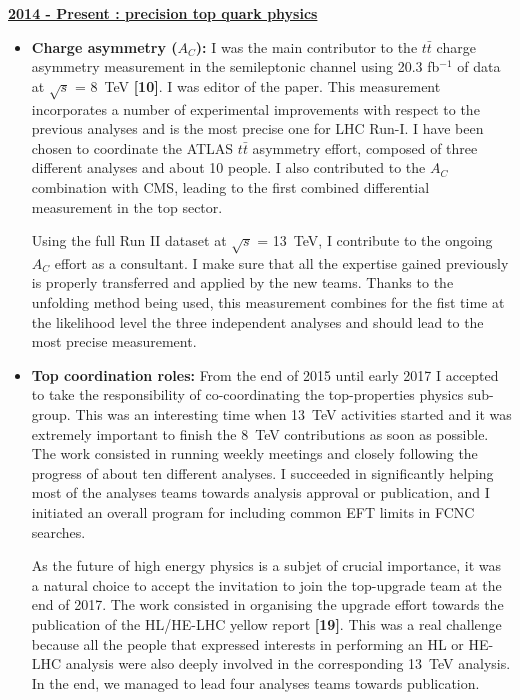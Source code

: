\documentclass[12pt]{article}
\begin{document}
{\bf \underline{2014 - Present : precision top quark physics}}
\vskip 0.3cm
\begin{itemize}[leftmargin=1.3cm]
\itemsep0.8em

\item[] {\bf Charge asymmetry ($A_C$):}
I was the main contributor to the $t\bar{t}$ charge asymmetry measurement in the semileptonic channel 
using 20.3 fb$^{-1}$ of data at $\sqrt{s}$ = 8~TeV {\bf \color{red} [10]}. I was editor of the paper. This measurement incorporates a number of experimental improvements with respect to the previous analyses and is the most precise one for LHC Run-I. I have been chosen to coordinate the ATLAS $t\bar{t}$ asymmetry effort, composed of three different analyses and about 10 people. I also contributed to the $A_C$ combination with CMS, leading to the first combined differential measurement in the top sector.
\vspace{2.mm}

Using the full Run II dataset at $\sqrt{s}$ = 13~TeV,  I contribute to the ongoing $A_C$ effort as a consultant. I make sure that all the expertise gained previously is properly transferred and applied by the new teams. Thanks to the unfolding method being used, this measurement combines for the fist time at the likelihood level the three independent analyses and should lead to the most precise measurement. 

\item[] {\bf Top coordination roles: }
From the end of 2015 until early 2017 I accepted to take the responsibility of co-coordinating the top-properties physics sub-group. This was an interesting time when 13~TeV activities started and it was extremely important to finish the 8~TeV contributions as soon as possible. The work consisted in running weekly meetings and closely following the progress of about ten different analyses. I succeeded in significantly helping most of the analyses teams towards analysis approval or publication, and I initiated an overall program for including common EFT limits in FCNC searches.
\vspace{2.mm}

As the future of high energy physics is a subjet of crucial importance, it was a natural choice to accept the invitation to join the top-upgrade team at the end of 2017. The work consisted in organising the upgrade effort towards the publication of the HL/HE-LHC yellow report {\bf \color{red} [19]}. This was a real challenge because all the people that expressed interests in performing an HL or HE-LHC analysis were also deeply involved in the corresponding 13~TeV analysis. In the end, we managed to lead four analyses teams towards publication.


\end{itemize}
\end{document}
